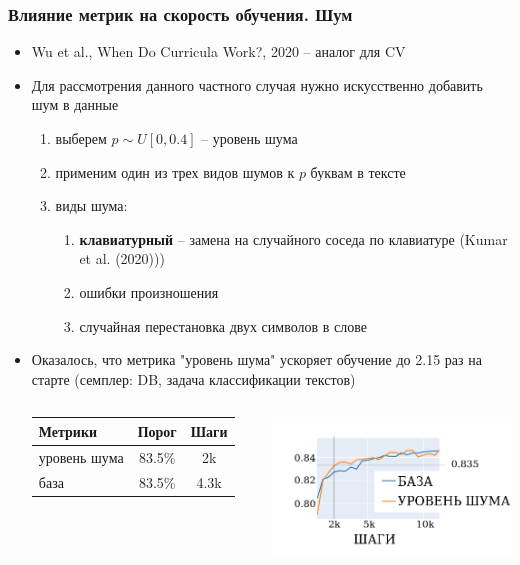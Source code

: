\documentclass{beamer}
\begin{document}
\begin{frame}
	\frametitle{Влияние метрик на скорость обучения. Шум}
	\begin{itemize}
		\item Wu et al., When Do Curricula Work?, 2020 -- аналог для CV
		\item Для рассмотрения данного частного случая нужно искусственно добавить шум в данные
			\begin{enumerate}
				\item выберем $p \sim U[0, 0.4]$ -- уровень шума
				\item применим один из трех видов шумов к $p$ буквам в тексте
				\item виды шума:
					\begin{enumerate}
						\item {\bf клавиатурный} -- замена на случайного соседа по клавиатуре (Kumar et al. (2020)))
						\item ошибки произношения
						\item случайная перестановка двух символов в слове
					\end{enumerate}
			\end{enumerate}
		\item Оказалось, что метрика "уровень шума" ускоряет обучение до 2.15 раз на старте (семплер: DB, задача классификации текстов)
		
		\begin{columns}
				\begin{table}
					\begin{tabular}{lcc}
						\hline
						Метрики & Порог & Шаги \\
						\hline
						уровень шума & 83.5\% & 2k\\
						\hline
						база & 83.5\% & 4.3k\\
						\hline
					\end{tabular}
				\end{table}			
				\centering
				\includegraphics[scale=0.4]{keyboard_noise_level_short_prefix}
		\end{columns}
	\end{itemize}
\end{frame}
\end{document}
